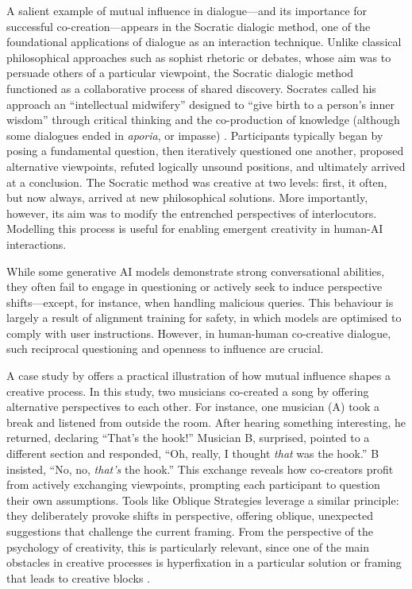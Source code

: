 A salient example of mutual influence in dialogue—and its importance for successful co-creation—appears in the Socratic dialogic method, one of the foundational applications of dialogue as an interaction technique. Unlike classical philosophical approaches such as sophist rhetoric or debates, whose aim was to persuade others of a particular viewpoint, the Socratic dialogic method functioned as a collaborative process of shared discovery. Socrates called his approach an “intellectual midwifery” designed to “give birth to a person’s inner wisdom” through critical thinking and the co-production of knowledge (although some dialogues ended in \textit{aporia}, or impasse) \cite{Nails2005-iq, Wikipedia-contributors2024-hr}. Participants typically began by posing a fundamental question, then iteratively questioned one another, proposed alternative viewpoints, refuted logically unsound positions, and ultimately arrived at a conclusion. The Socratic method was creative at two levels: first, it often, but now always, arrived at new philosophical solutions. More importantly, however, its aim was to modify the entrenched perspectives of interlocutors. Modelling this process is useful for enabling emergent creativity in human-AI interactions.

While some generative AI models demonstrate strong conversational abilities, they often fail to engage in questioning or actively seek to induce perspective shifts—except, for instance, when handling malicious queries. This behaviour is largely a result of alignment training for safety, in which models are optimised to comply with user instructions. However, in human-human co-creative dialogue, such reciprocal questioning and openness to influence are crucial.

A case study by \cite{Bown2020-oc} offers a practical illustration of how mutual influence shapes a creative process. In this study, two musicians co-created a song by offering alternative perspectives to each other. For instance, one musician (A) took a break and listened from outside the room. After hearing something interesting, he returned, declaring “That’s the hook!” Musician B, surprised, pointed to a different section and responded, “Oh, really, I thought \textit{that} was the hook.” B insisted, “No, no, \textit{that’s} the hook.” This exchange reveals how co-creators profit from actively exchanging viewpoints, prompting each participant to question their own assumptions. Tools like Oblique Strategies leverage a similar principle: they deliberately provoke shifts in perspective, offering oblique, unexpected suggestions that challenge the current framing. From the perspective of the psychology of creativity, this is particularly relevant, since one of the main obstacles in creative processes is hyperfixation in a particular solution or framing that leads to creative blocks \cite{Jansson1991-wy}. 


